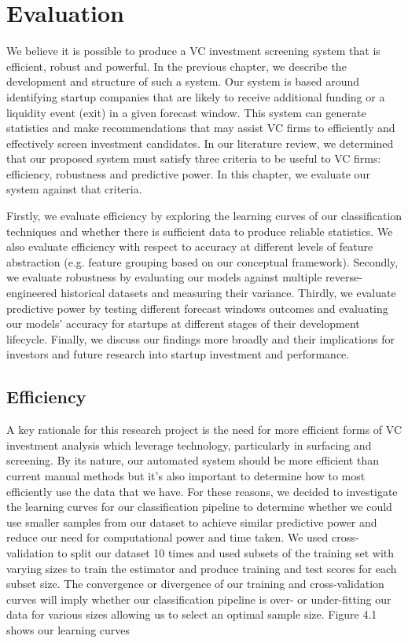 \documentclass[../thesis/thesis.tex]{subfiles}
\begin{document}
 \chapter{Evaluation}

We believe it is possible to produce a VC investment screening system that is efficient, robust and powerful. In the previous chapter, we describe the development and structure of such a system. Our system is based around identifying startup companies that are likely to receive additional funding or a liquidity event (exit) in a given forecast window. This system can generate statistics and make recommendations that may assist VC firms to efficiently and effectively screen investment candidates. In our literature review, we determined that our proposed system must satisfy three criteria to be useful to VC firms: efficiency, robustness and predictive power. In this chapter, we evaluate our system against that criteria.

Firstly, we evaluate efficiency by exploring the learning curves of our classification techniques and whether there is sufficient data to produce reliable statistics. We also evaluate efficiency with respect to accuracy at different levels of feature abstraction (e.g. feature grouping based on our conceptual framework). Secondly, we evaluate robustness by evaluating our models against multiple reverse-engineered historical datasets and measuring their variance. Thirdly, we evaluate predictive power by testing different forecast windows outcomes and evaluating our models’ accuracy for startups at different stages of their development lifecycle. Finally, we discuss our findings more broadly and their implications for investors and future research into startup investment and performance.

\section{Efficiency}

A key rationale for this research project is the need for more efficient forms of VC investment analysis which leverage technology, particularly in surfacing and screening. By its nature, our automated system should be more efficient than current manual methods but it's also important to determine how to most efficiently use the data that we have. For these reasons, we decided to investigate the learning curves for our classification pipeline to determine whether we could use smaller samples from our dataset to achieve similar predictive power and reduce our need for computational power and time taken. We used cross-validation to split our dataset 10 times and used subsets of the training set with varying sizes to train the estimator and produce training and test scores for each subset size. The convergence or divergence of our training and cross-validation curves will imply whether our classification pipeline is over- or under-fitting our data for various sizes allowing us to select an optimal sample size. Figure 4.1 shows our learning curves
\end{document}
